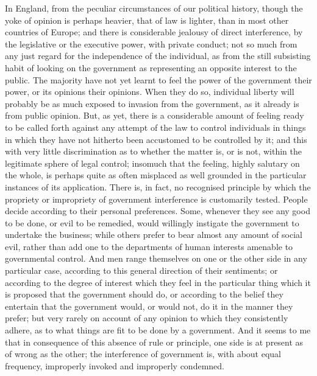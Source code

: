 \documentclass[11pt,openany]{book}
\begin{document}
In England, from the peculiar circumstances of our political history, though the yoke of opinion is perhaps heavier, that of law is lighter, than in most other countries of Europe; and there is considerable jealousy of direct interference, by the legislative or the executive power, with private conduct; not so much from any just regard for the independence of the individual, as from the still subsisting habit of looking on the government as representing an opposite interest to the public. The majority have not yet learnt to feel the power of the government their power, or its opinions their opinions. When they do so, individual liberty will probably be as much exposed to invasion from the government, as it already is from public opinion. But, as yet, there is a considerable amount of feeling ready to be called forth against any attempt of the law to control individuals in things in which they have not hitherto been accustomed to be controlled by it; and this with very little discrimination as to whether the matter is, or is not, within the legitimate sphere of legal control; insomuch that the feeling, highly salutary on the whole, is perhaps quite as often misplaced as well grounded in the particular instances of its application. There is, in fact, no recognised principle by which the propriety or impropriety of government interference is customarily tested. People decide according to their personal preferences. Some, whenever they see any good to be done, or evil to be remedied, would willingly instigate the government to undertake the business; while others prefer to bear almost any amount of social evil, rather than add one to the departments of human interests amenable to governmental control. And men range themselves on one or the other side in any particular case, according to this general direction of their sentiments; or according to the degree of interest which they feel in the particular thing which it is proposed that the government should do, or according to the belief they entertain that the government would, or would not, do it in the manner they prefer; but very rarely on account of any opinion to which they consistently adhere, as to what things are fit to be done by a government. And it seems to me that in consequence of this absence of rule or principle, one side is at present as of wrong as the other; the interference of government is, with about equal frequency, improperly invoked and improperly condemned.
\end{document}
